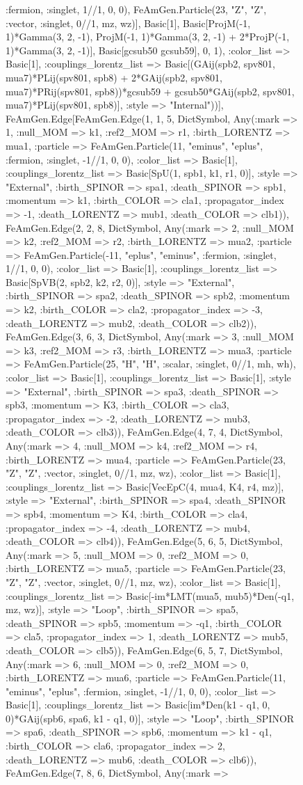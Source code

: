 \documentclass{revtex4}
\begin{document}
\begin{figure}[!htb]
\begin{center}
{:fermion, :singlet, 1//1, 0, 0), FeAmGen.Particle(23, "Z", "Z", :vector, :singlet, 0//1, mz, wz)], Basic[1], Basic[ProjM(-1, 1)*Gamma(3, 2, -1), ProjM(-1, 1)*Gamma(3, 2, -1) + 2*ProjP(-1, 1)*Gamma(3, 2, -1)], Basic[gcsub50 gcsub59], 0, 1), :color_list => Basic[1], :couplings_lorentz_list => Basic[(GAij(spb2, spv801, mua7)*PLij(spv801, spb8) + 2*GAij(spb2, spv801, mua7)*PRij(spv801, spb8))*gcsub59 + gcsub50*GAij(spb2, spv801, mua7)*PLij(spv801, spb8)], :style => "Internal"))], FeAmGen.Edge[FeAmGen.Edge(1, 1, 5, Dict{Symbol, Any}(:mark => 1, :null_MOM => k1, :ref2_MOM => r1, :birth_LORENTZ => mua1, :particle => FeAmGen.Particle(11, "eminus", "eplus", :fermion, :singlet, -1//1, 0, 0), :color_list => Basic[1], :couplings_lorentz_list => Basic[SpU(1, spb1, k1, r1, 0)], :style => "External", :birth_SPINOR => spa1, :death_SPINOR => spb1, :momentum => k1, :birth_COLOR => cla1, :propagator_index => -1, :death_LORENTZ => mub1, :death_COLOR => clb1)), FeAmGen.Edge(2, 2, 8, Dict{Symbol, Any}(:mark => 2, :null_MOM => k2, :ref2_MOM => r2, :birth_LORENTZ => mua2, :particle => FeAmGen.Particle(-11, "eplus", "eminus", :fermion, :singlet, 1//1, 0, 0), :color_list => Basic[1], :couplings_lorentz_list => Basic[SpVB(2, spb2, k2, r2, 0)], :style => "External", :birth_SPINOR => spa2, :death_SPINOR => spb2, :momentum => k2, :birth_COLOR => cla2, :propagator_index => -3, :death_LORENTZ => mub2, :death_COLOR => clb2)), FeAmGen.Edge(3, 6, 3, Dict{Symbol, Any}(:mark => 3, :null_MOM => k3, :ref2_MOM => r3, :birth_LORENTZ => mua3, :particle => FeAmGen.Particle(25, "H", "H", :scalar, :singlet, 0//1, mh, wh), :color_list => Basic[1], :couplings_lorentz_list => Basic[1], :style => "External", :birth_SPINOR => spa3, :death_SPINOR => spb3, :momentum => K3, :birth_COLOR => cla3, :propagator_index => -2, :death_LORENTZ => mub3, :death_COLOR => clb3)), FeAmGen.Edge(4, 7, 4, Dict{Symbol, Any}(:mark => 4, :null_MOM => k4, :ref2_MOM => r4, :birth_LORENTZ => mua4, :particle => FeAmGen.Particle(23, "Z", "Z", :vector, :singlet, 0//1, mz, wz), :color_list => Basic[1], :couplings_lorentz_list => Basic[VecEpC(4, mua4, K4, r4, mz)], :style => "External", :birth_SPINOR => spa4, :death_SPINOR => spb4, :momentum => K4, :birth_COLOR => cla4, :propagator_index => -4, :death_LORENTZ => mub4, :death_COLOR => clb4)), FeAmGen.Edge(5, 6, 5, Dict{Symbol, Any}(:mark => 5, :null_MOM => 0, :ref2_MOM => 0, :birth_LORENTZ => mua5, :particle => FeAmGen.Particle(23, "Z", "Z", :vector, :singlet, 0//1, mz, wz), :color_list => Basic[1], :couplings_lorentz_list => Basic[-im*LMT(mua5, mub5)*Den(-q1, mz, wz)], :style => "Loop", :birth_SPINOR => spa5, :death_SPINOR => spb5, :momentum => -q1, :birth_COLOR => cla5, :propagator_index => 1, :death_LORENTZ => mub5, :death_COLOR => clb5)), FeAmGen.Edge(6, 5, 7, Dict{Symbol, Any}(:mark => 6, :null_MOM => 0, :ref2_MOM => 0, :birth_LORENTZ => mua6, :particle => FeAmGen.Particle(11, "eminus", "eplus", :fermion, :singlet, -1//1, 0, 0), :color_list => Basic[1], :couplings_lorentz_list => Basic[im*Den(k1 - q1, 0, 0)*GAij(spb6, spa6, k1 - q1, 0)], :style => "Loop", :birth_SPINOR => spa6, :death_SPINOR => spb6, :momentum => k1 - q1, :birth_COLOR => cla6, :propagator_index => 2, :death_LORENTZ => mub6, :death_COLOR => clb6)), FeAmGen.Edge(7, 8, 6, Dict{Symbol, Any}(:mark => }
\end{center}
\end{figure}
\end{document}

